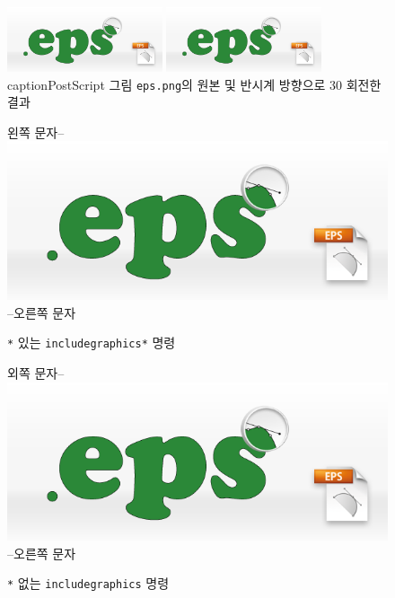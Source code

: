 \documentclass[11pt]{article}
\begin{document}
\begin{figure}[t]
\begin{center}
\includegraphics[width=1.8in]{../images/eps.png}
\includegraphics[width=1.8in, angle=-30]{eps.png}
caption{PostScript 그림 \texttt{eps.png}의 원본 및 반시계 방향으로 30 \degree 회전한 결과 \label{fig:sunrise}}
\end{center}
\end{figure}

\begin{figure}[t]
왼쪽 문자--
\includegraphics*[bb=0 0 150 305]{eps.png}
--오른쪽 문자
\caption{\texttt{*} 있는 \texttt{includegraphics*} 명령 \label{fig:include*}}
\end{figure}

\begin{figure}[t]
외쪽 문자--
\includegraphics[bb=0 0 150 300]{eps.png}
--오른쪽 문자
\caption{\texttt{*} 없는 \texttt{includegraphics} 명령 \label{fig:include0}}
\end{figure}
\end{document}
